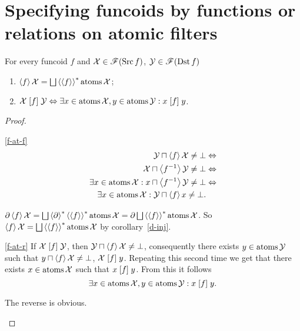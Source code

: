 \section{Specifying funcoids by functions or relations on atomic filters}
\begin{thm}\label{fcd-atoms}
For every funcoid $f$ and
$\mathcal{X}\in\mathscr{F}(\operatorname{Src} f)$,
$\mathcal{Y}\in\mathscr{F}(\operatorname{Dst} f)$
\begin{enumerate}
\item \label{f-at-f}$\supfun f\mathcal{X}=\bigsqcup\rsupfun{\supfun
f}\atoms\mathcal{X}$;
\item \label{f-at-r}$\mathcal{X}\mathrel{\left[f\right]}\mathcal{Y}\Leftrightarrow\exists
x\in\operatorname{atoms}\mathcal{X},y\in\operatorname{atoms}\mathcal{Y}:x\mathrel{\left[f\right]}y$.
\end{enumerate}
\end{thm}
\begin{proof}
~
\begin{widedisorder}
\item [{\ref{f-at-f}}] ~
\begin{align*}
\mathcal{Y}\sqcap\left\langle f\right\rangle\mathcal{X}\ne\bot &
\Leftrightarrow\\
\mathcal{X}\sqcap\left\langle f^{-1}\right\rangle\mathcal{Y}\ne\bot &
\Leftrightarrow\\
\exists
x\in\operatorname{atoms}\mathcal{X}:x\sqcap\left\langle f^{-1}\right\rangle\mathcal{Y}\ne\bot & \Leftrightarrow\\
\exists x\in\operatorname{atoms}\mathcal{X}:\mathcal{Y}\sqcap\left\langle f\right\rangle x\ne\bot.
\end{align*}



$\corestar\supfun f\mathcal{X}=\bigsqcup\rsupfun{\corestar}\rsupfun{\supfun
f}\atoms\mathcal{X}=\corestar\bigsqcup\rsupfun{\supfun f}\atoms\mathcal{X}$.
So $\supfun f\mathcal{X}=\bigsqcup\rsupfun{\supfun f}\atoms\mathcal{X}$
by corollary~\ref{d-inj}.

\item [{\ref{f-at-r}}] If $\mathcal{X}\mathrel{\left[f\right]}\mathcal{Y}$, then
$\mathcal{Y}\sqcap\left\langle f\right\rangle\mathcal{X}\ne\bot$,
consequently there exists $y\in\operatorname{atoms}\mathcal{Y}$ such that $y\sqcap\left\langle f\right\rangle\mathcal{X}\ne\bot$,
$\mathcal{X}\mathrel{\left[f\right]}y$. Repeating this second time we get that there
exists $x\in\operatorname{atoms}\mathcal{X}$ such that $x\mathrel{\left[f\right]}y$. From this
it follows
\[
\exists x\in\operatorname{atoms}\mathcal{X},y\in\operatorname{atoms}\mathcal{Y}:x\mathrel{\left[f\right]}y.
\]



The reverse is obvious.

\end{widedisorder}
\end{proof}
